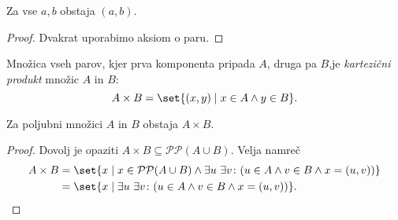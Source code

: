 \documentclass[12pt, a4paper]{article}
\begin{document}
\begin{trditev}
Za vse $a,b$ obstaja $(a,b)$.
\end{trditev}

\begin{proof}
Dvakrat uporabimo aksiom o paru.
\end{proof}

\begin{okvir}
\begin{definicija}
Množica vseh parov, kjer prva komponenta pripada $A$, druga pa $B$,je \emph{kartezični produkt} množic $A$ in $B$:
\[
A\times B=\set{(x,y)\mid x\in A\land y\in B}.
\]
\end{definicija}
\end{okvir}

\begin{trditev}
Za poljubni množici $A$ in $B$ obstaja $A\times B$.
\end{trditev}

\begin{proof}
Dovolj je opaziti $A\times B\subseteq\mathcal{PP}(A\cup B)$. Velja namreč
\begin{align*}
A\times B&=\set{x\mid x\in\mathcal{PP}(A\cup B)\land \exists u~\exists v\colon(u\in A\land v\in B\land x=(u,v))}
\\
&=\set{x\mid\exists u~\exists v\colon(u\in A\land v\in B\land x=(u,v))}.\qedhere
\end{align*}
\end{proof}
\end{document}
